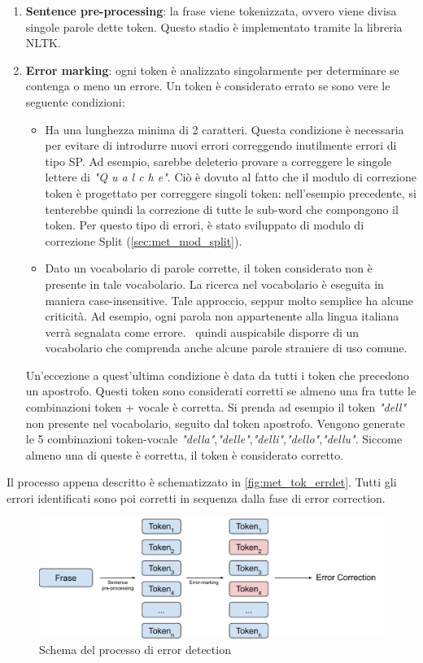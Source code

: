 \begin{enumerate}
\item \textbf{Sentence pre-processing}: la frase viene tokenizzata, ovvero viene divisa singole parole dette token. Questo stadio è implementato tramite la libreria NLTK\cite{nltk}.
\item \textbf{Error marking}: ogni token è analizzato singolarmente per determinare se contenga o meno un errore. Un token è considerato errato se sono vere le seguente condizioni:
	\begin{itemize}
	\item Ha una lunghezza minima di 2 caratteri. Questa condizione è necessaria per evitare di introdurre nuovi errori correggendo inutilmente errori di tipo SP. Ad esempio, sarebbe deleterio provare a correggere le singole lettere di \textit{"Q u a l c h e"}. Ciò è dovuto al fatto che il modulo di correzione token è progettato per correggere singoli token: nell'esempio precedente, si tenterebbe quindi la correzione di tutte le sub-word che compongono il token. Per questo tipo di errori, è stato sviluppato di modulo di correzione Split (\autoref{sec:met_mod_split}).
	
	\item Dato un vocabolario di parole corrette, il token considerato non è presente in tale vocabolario. La ricerca nel vocabolario è eseguita in maniera case-insensitive. Tale approccio, seppur molto semplice ha alcune criticità. Ad esempio, ogni parola non appartenente alla lingua italiana verrà segnalata come errore. \E\ quindi auspicabile disporre di un vocabolario che comprenda anche alcune parole straniere di uso comune.
	\end{itemize}
Un'eccezione a quest'ultima condizione è data da tutti i token che precedono un apostrofo. Questi token sono considerati corretti se almeno una fra tutte le combinazioni token + vocale è corretta. Si prenda ad esempio il token \textit{"dell"} non presente nel vocabolario, seguito dal token apostrofo. Vengono generate le 5 combinazioni token-vocale \textit{"della"},\textit{"delle"},\textit{"delli"},\textit{"dello"},\textit{"dellu"}. Siccome almeno una di queste è corretta, il token è considerato corretto.
\end{enumerate}

Il processo appena descritto è schematizzato in \autoref{fig:met_tok_errdet}. Tutti gli errori identificati sono poi corretti in sequenza dalla fase di error correction. 

\begin{figure}[H]
\centering
\includegraphics[width=\textwidth]{immagini/metodologia/error_detection}
\caption{Schema del processo di error detection}
\label{fig:met_tok_errdet}
\end{figure}

